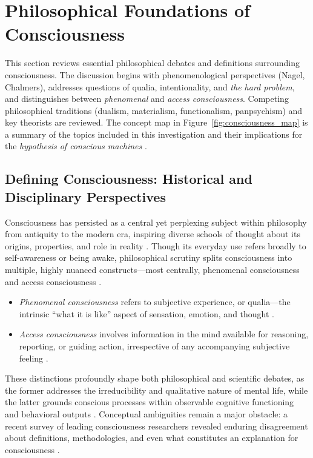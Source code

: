\section{Philosophical Foundations of Consciousness}

This section reviews essential philosophical debates and definitions surrounding consciousness. The discussion begins with phenomenological perspectives (Nagel, Chalmers), addresses questions of qualia, intentionality, and \emph{the hard problem}, and distinguishes between \emph{phenomenal} and \emph{access consciousness}. Competing philosophical traditions (dualism, materialism, functionalism, panpsychism) and key theorists are reviewed. The concept map in Figure~\ref{fig:consciousness_map} is a summary of the topics included in this investigation and their implications for the \emph{hypothesis of conscious machines} .

\subsection{Defining Consciousness: Historical and Disciplinary Perspectives}

Consciousness has persisted as a central yet perplexing subject within philosophy from antiquity to the modern era, inspiring diverse schools of thought about its origins, properties, and role in reality \cite{francken2022consciousness,reggia2013rise}. Though its everyday use refers broadly to self-awareness or being awake, philosophical scrutiny splits consciousness into multiple, highly nuanced constructs---most centrally, phenomenal consciousness and access consciousness \cite{block1995confusion,rosenthal2009concepts}.

\begin{itemize}
\item \emph{Phenomenal consciousness} refers to subjective experience, or qualia---the intrinsic ``what it is like'' aspect of sensation, emotion, and thought \cite{levine1983materialism,nagel1974like}.
\item \emph{Access consciousness} involves information in the mind available for reasoning, reporting, or guiding action, irrespective of any accompanying subjective feeling \cite{block1995confusion}.
\end{itemize}

These distinctions profoundly shape both philosophical and scientific debates, as the former addresses the irreducibility and qualitative nature of mental life, while the latter grounds conscious processes within observable cognitive functioning and behavioral outputs \cite{garridomerchan2024machine,reggia2013rise}. Conceptual ambiguities remain a major obstacle: a recent survey of leading consciousness researchers revealed enduring disagreement about definitions, methodologies, and even what constitutes an explanation for consciousness \cite{francken2022consciousness}.


